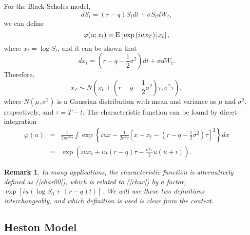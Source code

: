\documentclass[12pt]{article}
\newtheorem{remark}{Remark}
\begin{document}
    For the Black-Scholes model, 
    \begin{equation}
      dS_t=(r-q)S_tdt+\sigma S_tdW_t,
    \end{equation}
    we can define 
    \begin{equation}
      \varphi(u; x_t)={\rm E}\left[\left.\exp\left(iux_T\right)\right|x_t\right],
      \label{char00}
    \end{equation}
    where $x_t=\log S_t$, and it can be shown that
    \begin{equation}
      dx_t = \left(r-q-\frac{1}{2}\sigma^2\right) dt + \sigma dW_t.
    \end{equation}
    Therefore, 
    \begin{equation}
      x_T\sim N\left(x_t+\left(r-q-\frac{1}{2}\sigma^2\right)\tau, \sigma^2\tau\right),
    \end{equation}
    where $N(\mu,\sigma^2)$ is a Gaussian distribution with mean and variance
    as $\mu$ and $\sigma^2$, respectively, and $\tau=T-t$. The characteristic function can be found by direct integration
    \begin{eqnarray}
      \varphi(u)&=&\frac{1}{2\pi\sigma^2 \tau}\int \exp\left\{iux-\frac{1}{2\sigma^2\tau}
                      \left[x-x_t-\left(r-q-\frac{1}{2}\sigma^2\right)\tau\right]^2\right\}dx\nonumber\\
                &=&\exp\left(iux_t + iu(r-q)\tau -\frac{\sigma^2\tau}{2}u(u+i)\right).
      \label{BS}
    \end{eqnarray}

    \begin{remark}
      In many applications, the characteristic function is alternatively defined as (\ref{char00}), which is related
      to (\ref{char}) by a factor, $\exp\left[iu(\log S_0 +(r-q)t)\right]$. We will use these two definitions interchangeably, and which 
      definition is used is clear from the context.
    \end{remark}

  \subsection{Heston Model}
\end{document}
